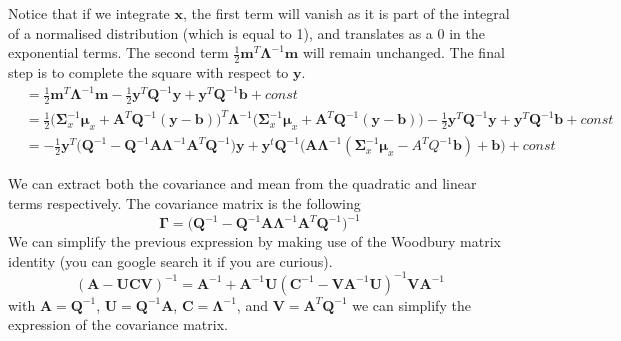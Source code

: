 \begin{enumerate}
\begin{equation}
\end{equation}
Notice that if we integrate $\textbf{x}$, the first term will vanish as it is part of the integral of a normalised distribution (which is equal to 1), and translates as a 0 in the exponential terms. The second term $\frac{1}{2}\textbf{m}^T\bm{\Lambda}^{-1}\textbf{m}$ will remain unchanged. The final step is to complete the square with respect to $\textbf{y}$.
\begin{align*}
&=\frac{1}{2}\textbf{m}^T\bm{\Lambda}^{-1}\textbf{m} - \frac{1}{2}\textbf{y}^T\textbf{Q}^{-1}\textbf{y} + \textbf{y}^T\textbf{Q}^{-1}\textbf{b} + const\\
&=\frac{1}{2}\Big(\bm{\Sigma}_x^{-1}\bm{\mu}_x + \textbf{A}^T\textbf{Q}^{-1}(\textbf{y} - \textbf{b})\Big)^T\bm{\Lambda}^{-1}\Big(\bm{\Sigma}_x^{-1}\bm{\mu}_x + \textbf{A}^T\textbf{Q}^{-1}(\textbf{y} - \textbf{b}) \Big) - \frac{1}{2}\textbf{y}^T\textbf{Q}^{-1}\textbf{y} + \textbf{y}^T\textbf{Q}^{-1}\textbf{b} + const\\
&=-\frac{1}{2}\textbf{y}^T\Big(\textbf{Q}^{-1} - \textbf{Q}^{-1}\textbf{A}\bm{\Lambda}^{-1}\textbf{A}^T\textbf{Q}^{-1}\Big)\textbf{y} + \textbf{y}^t\textbf{Q}^{-1}\Big(\textbf{A}\bm{\Lambda}^{-1}(\bm{\Sigma}_x^{-1}\bm{\mu}_x - A^TQ^{-1}\textbf{b} )+ \textbf{b} \Big) + const
\end{align*}

We can extract both the covariance and mean from the quadratic and linear terms respectively. The covariance matrix is the following
\[
\bm{\Gamma} = \Big(\textbf{Q}^{-1} - \textbf{Q}^{-1}\textbf{A}\bm{\Lambda}^{-1}\textbf{A}^T\textbf{Q}^{-1}\Big)^{-1}
\]
We can simplify the previous expression by making use of the Woodbury matrix identity (you can google search it if you are curious).
\[
(\textbf{A} - \textbf{U}\textbf{C}\textbf{V})^{-1} = \textbf{A}^{-1} + \textbf{A}^{-1}\textbf{U}(\textbf{C}^{-1} - \textbf{V}\textbf{A}^{-1}\textbf{U})^{-1}\textbf{V}\textbf{A}^{-1}
\]
with $\textbf{A} = \textbf{Q}^{-1}$, $\textbf{U} = \textbf{Q}^{-1}\textbf{A}$, $\textbf{C} = \bm{\Lambda}^{-1}$, and $\textbf{V} = \textbf{A}^T \textbf{Q}^{-1}$ we can simplify the expression of the covariance matrix.


\end{enumerate}
